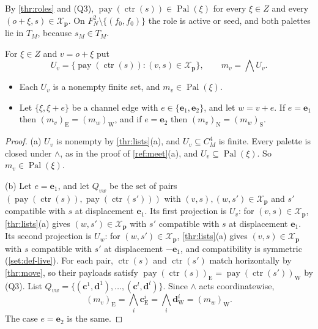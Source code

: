 By \cref{thr:roles} and (Q3), $\operatorname{pay}(\operatorname{ctr}(s))\in\operatorname{Pal}(\xi)$ for every $\xi\in Z$ and every $(o+\xi,s)\in\mathcal X_{\mathbf p}$. On $F_N^2\setminus\{(f_0,f_0)\}$ the role is active or seed, and both palettes lie in $T_M$, because $s_M\in T_M$.

\begin{lemma}\label{thr:meet}
For $\xi\in Z$ and $v=o+\xi$ put
\[
U_v=\bigl\{\operatorname{pay}(\operatorname{ctr}(s)):(v,s)\in\mathcal X_{\mathbf p}\bigr\},\qquad m_v=\textstyle\bigwedge U_v .
\]
\begin{itemize}
\item[(a)] Each $U_v$ is a nonempty finite set, and $m_v\in\operatorname{Pal}(\xi)$.
\item[(b)] Let $\{\xi,\xi+e\}$ be a channel edge with $e\in\{\mathbf e_1,\mathbf e_2\}$, and let $w=v+e$. If $e=\mathbf e_1$ then $(m_v)_{\mathrm E}=(m_w)_{\mathrm W}$, and if $e=\mathbf e_2$ then $(m_v)_{\mathrm N}=(m_w)_{\mathrm S}$.
\end{itemize}
\end{lemma}

\begin{proof}
(a) $U_v$ is nonempty by \cref{thr:lists}(a), and $U_v\subseteq C_M^4$ is finite. Every palette is closed under $\wedge$, as in the proof of \cref{ref:meet}(a), and $U_v\subseteq\operatorname{Pal}(\xi)$. So $m_v\in\operatorname{Pal}(\xi)$.

(b) Let $e=\mathbf e_1$, and let $Q_{vw}$ be the set of pairs $(\operatorname{pay}(\operatorname{ctr}(s)),\operatorname{pay}(\operatorname{ctr}(s')))$ with $(v,s),(w,s')\in\mathcal X_{\mathbf p}$ and $s'$ compatible with $s$ at displacement $\mathbf e_1$. Its first projection is $U_v$: for $(v,s)\in\mathcal X_{\mathbf p}$, \cref{thr:lists}(a) gives $(w,s')\in\mathcal X_{\mathbf p}$ with $s'$ compatible with $s$ at displacement $\mathbf e_1$. Its second projection is $U_w$: for $(w,s')\in\mathcal X_{\mathbf p}$, \cref{thr:lists}(a) gives $(v,s)\in\mathcal X_{\mathbf p}$ with $s$ compatible with $s'$ at displacement $-\mathbf e_1$, and compatibility is symmetric (\cref{set:def-live}). For each pair, $\operatorname{ctr}(s)$ and $\operatorname{ctr}(s')$ match horizontally by \cref{thr:move}, so their payloads satisfy $\operatorname{pay}(\operatorname{ctr}(s))_{\mathrm E}=\operatorname{pay}(\operatorname{ctr}(s'))_{\mathrm W}$ by (Q3). List $Q_{vw}=\{(\mathbf c^1,\mathbf d^1),\dots,(\mathbf c^l,\mathbf d^l)\}$. Since $\wedge$ acts coordinatewise,
\[
(m_v)_{\mathrm E}=\textstyle\bigwedge_i\mathbf c^i_{\mathrm E}=\bigwedge_i\mathbf d^i_{\mathrm W}=(m_w)_{\mathrm W}.
\]
The case $e=\mathbf e_2$ is the same.
\end{proof}

